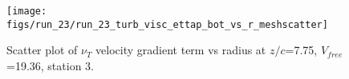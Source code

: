 \begin{figure}[H]
\centering
\texttt{[image: figs/run\_23/run\_23\_turb\_visc\_ettap\_bot\_vs\_r\_meshscatter]}
\caption{Scatter plot of $\nu_T$ velocity gradient term vs radius at $z/c$=7.75, $V_{free}$=19.36, station 3.}
\label{fig:run_23_turb_visc_ettap_bot_vs_r_meshscatter}
\end{figure}


